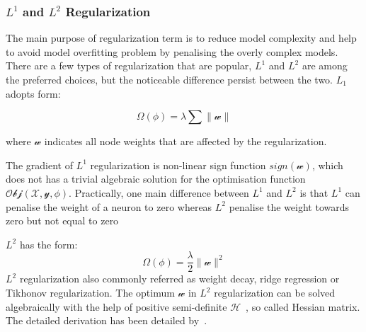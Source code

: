 \subsubsection{$L^1$ and $L^2$ Regularization}

The main purpose of regularization term is to reduce model complexity and help to avoid model overfitting problem by penalising the overly complex models. There are a few types of regularization that are popular, $L^1$ and $L^2$ are among the preferred choices, but the noticeable difference persist between the two. $L_1$ adopts form:

\begin{equation}
   \Omega(\phi) = \lambda \sum \parallel \mathcal{w} \parallel
\end{equation}

where $\mathcal{w}$ indicates all node weights that are affected by the regularization. 
\par 
The gradient of $L^1$ regularization is non-linear sign function $sign (\mathcal{w})$, which does not has a trivial algebraic solution for the optimisation function $\mathcal{Obj}(\mathcal{X},\mathcal{y},\phi)$. Practically, one main difference between $L^1$ and $L^2$ is that $L^1$ can penalise the weight of a neuron to zero whereas $L^2$ penalise the weight towards zero but not equal to zero

$L^2$ has the form:
\begin{equation}
   \Omega(\phi) = \frac {\lambda}{2} \parallel \mathcal{w} \parallel^2
\end{equation}
$L^2$ regularization also commonly referred as weight decay, ridge regression or Tikhonov regularization. The optimum $\mathcal{w}$ in $L^2$ regularization can be solved algebraically with the help of positive semi-definite $\mathcal{H}$~\cite{Goodfellow-et-al-2016}, so called Hessian matrix. The detailed derivation has been detailed by~\citet{Goodfellow-et-al-2016}.